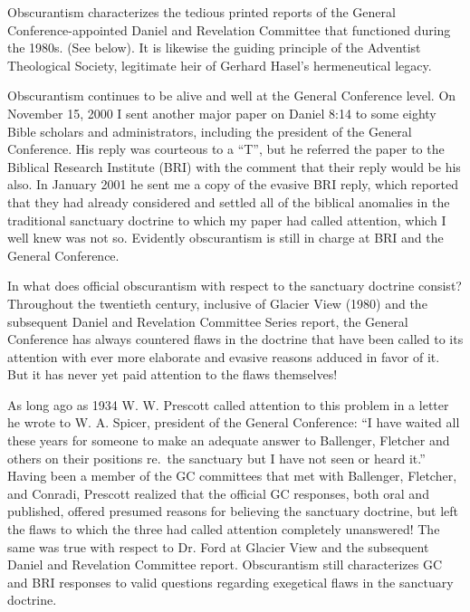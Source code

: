 Obscurantism characterizes the tedious printed reports of the General
Conference-appointed Daniel and Revelation Committee that functioned during
the 1980s. (See below). It is likewise the guiding principle of the
Adventist Theological Society, legitimate heir of Gerhard Hasel's
hermeneutical legacy.

Obscurantism continues to be alive and well at the General Conference level.
On November 15, 2000 I sent another major paper on Daniel 8:14 to some
eighty Bible scholars and administrators, including the president of the
General Conference. His reply was courteous to a ``T'', but he referred the
paper to the Biblical Research Institute (BRI) with the comment that their
reply would be his also. In January 2001 he sent me a copy of the evasive
BRI reply, which reported that they had already considered and settled all
of the biblical anomalies in the traditional sanctuary doctrine to which my
paper had called attention, which I well knew was not so. Evidently
obscurantism is still in charge at BRI and the General Conference.

In what does official obscurantism with respect to the sanctuary doctrine
consist? Throughout the twentieth century, inclusive of Glacier View (1980)
and the subsequent Daniel and Revelation Committee Series report, the
General Conference has always countered flaws in the doctrine that have been
called to its attention with ever more elaborate and evasive reasons adduced
in favor of it. But it has never yet paid attention to the flaws themselves!

As long ago as 1934 W. W. Prescott called attention to this problem in a
letter he wrote to W. A. Spicer, president of the General Conference: ``I
have waited all these years for someone to make an adequate answer to
Ballenger, Fletcher and others on their positions re.\ the sanctuary but I
have not seen or heard it.'' Having been a member of the GC committees
that met with Ballenger, Fletcher, and Conradi, Prescott realized that the
official GC responses, both oral and published, offered presumed reasons for
believing the sanctuary doctrine, but left the flaws to which the three had
called attention completely unanswered! The same was true with respect to
Dr. Ford at Glacier View and the subsequent Daniel and Revelation Committee
report. Obscurantism still characterizes GC and BRI responses to valid
questions regarding exegetical flaws in the sanctuary doctrine.
